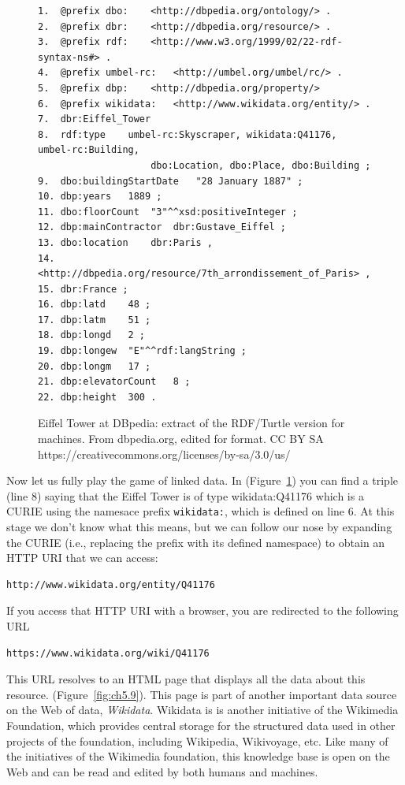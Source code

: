 \begin{figure}
 \begin{lstlisting}
1.	@prefix dbo:	<http://dbpedia.org/ontology/> .
2.	@prefix dbr:	<http://dbpedia.org/resource/> .
3.	@prefix rdf:	<http://www.w3.org/1999/02/22-rdf-syntax-ns#> .
4.	@prefix umbel-rc:	<http://umbel.org/umbel/rc/> .
5.	@prefix dbp:	<http://dbpedia.org/property/>
6.	@prefix wikidata:	<http://www.wikidata.org/entity/> .
7.	dbr:Eiffel_Tower
8.	rdf:type	umbel-rc:Skyscraper, wikidata:Q41176, umbel-rc:Building,
                    dbo:Location, dbo:Place, dbo:Building ;
9.	dbo:buildingStartDate	"28 January 1887" ;
10.	dbp:years	1889 ;
11.	dbo:floorCount	"3"^^xsd:positiveInteger ;
12.	dbp:mainContractor	dbr:Gustave_Eiffel ;
13.	dbo:location	dbr:Paris ,
14.	<http://dbpedia.org/resource/7th_arrondissement_of_Paris> ,
15.	dbr:France ;
16.	dbp:latd	48 ;
17.	dbp:latm	51 ;
18.	dbp:longd	2 ;
19.	dbp:longew	"E"^^rdf:langString ;
20.	dbp:longm	17 ;
21.	dbp:elevatorCount	8 ;
22.	dbp:height	300 .
 \end{lstlisting}
    \caption{Eiffel Tower at DBpedia: extract of the RDF/Turtle version for
machines. From dbpedia.org, edited for format.  CC BY SA https://creativecommons.org/licenses/by-sa/3.0/us/}
    \label{fig:ch5.8}
\end{figure}

Now let us fully play the game of linked data. In (Figure~\ref{fig:ch5.8}) you can
find a triple (line 8) saying that the Eiffel Tower is of type
wikidata:Q41176 which is a CURIE using the namesace prefix \texttt{wikidata:}, which is defined 
on line 6. At this stage we don't know what this
means, but we can follow our nose by expanding the CURIE (i.e., 
replacing the prefix with its defined  namespace) to obtain an HTTP URI that we
can access:

\begin{lstlisting}
http://www.wikidata.org/entity/Q41176
\end{lstlisting}

If you access that HTTP URI with a browser, you are redirected to the
following URL

\begin{lstlisting}
https://www.wikidata.org/wiki/Q41176
\end{lstlisting}


This URL resolves to an HTML page that displays all the data about this
resource.   
(Figure~\ref{fig:ch5.9}). This page is part of another important  data source on the Web of data, 
\emph{Wikidata}. Wikidata is  is another initiative of the Wikimedia Foundation, which provides 
central storage for the structured data used in other projects of the
foundation,  including Wikipedia, Wikivoyage, etc.  Like many of the initiatives of the Wikimedia foundation, this knowledge
base is open on the Web and can be read and edited by both humans and
machines.

